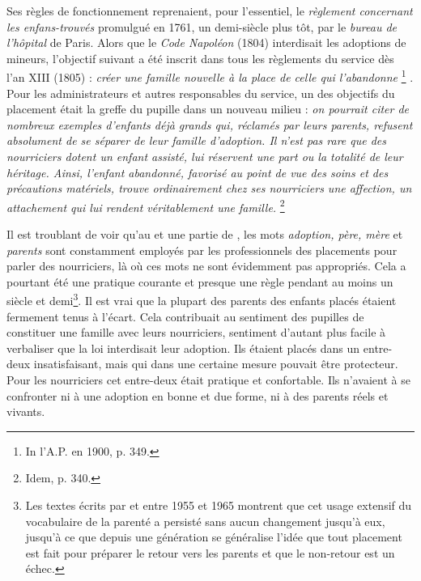  Ses règles de fonctionnement reprenaient, pour l'essentiel, le \emph{règlement concernant les enfans-trouvés} promulgué en 1761, un demi-siècle plus tôt, par le \emph{bureau de l'hôpital} de Paris. Alors que le \emph{Code Napoléon} (1804) interdisait les adoptions de mineurs, l'objectif suivant a été inscrit dans tous les règlements du service dès l'an XIII (1805) : \emph{créer une famille nouvelle à la place de celle qui l'abandonne}%
\footnote{In l'A.P. en 1900, p. 349.}%
. Pour les administrateurs et autres responsables du service, un des objectifs du placement était la greffe du pupille dans un nouveau milieu : \emph{on pourrait citer de nombreux exemples d'enfants déjà grands qui, réclamés par leurs parents, refusent absolument de se séparer de leur famille d'adoption. Il n'est pas rare que des nourriciers dotent un enfant assisté, lui réservent une part ou la totalité de leur héritage. Ainsi, l'enfant abandonné, favorisé au point de vue des soins et des précautions matériels, trouve ordinairement chez ses nourriciers une affection, un attachement qui lui rendent véritablement une famille.}%
\footnote{Idem, p. 340.} 

 Il est troublant de voir qu'au  et une partie de , les mots \emph{adoption, père, mère} et \emph{parents} sont constamment employés par les professionnels des placements pour parler des nourriciers, là où ces mots ne sont évidemment pas appropriés. Cela a pourtant été une pratique courante et presque une règle pendant au moins un siècle et demi\footnote{Les textes écrits par  et  entre 1955 et 1965 montrent que cet usage extensif du vocabulaire de la parenté a persisté sans aucun changement jusqu'à eux, jusqu'à ce que depuis une génération se généralise l'idée que tout placement est fait pour préparer le retour vers les parents et que le non-retour est un échec.}. Il est vrai que la plupart des parents des enfants placés étaient fermement tenus à l'écart. Cela contribuait au sentiment des pupilles de constituer une famille avec leurs nourriciers, sentiment d'autant plus facile à verbaliser que la loi interdisait leur adoption. Ils étaient placés dans un entre-deux insatisfaisant, mais qui dans une certaine mesure pouvait être protecteur. Pour les nourriciers cet entre-deux était pratique et confortable. Ils n'avaient à se confronter ni à une adoption en bonne et due forme, ni à des parents réels et vivants. 

